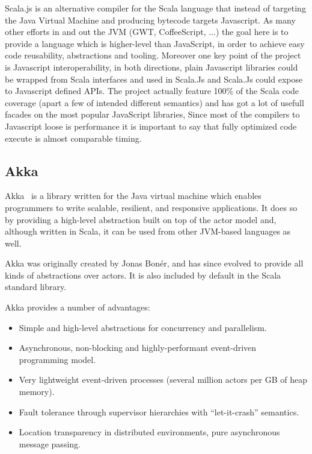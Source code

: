 \documentclass{sig-alternate}
\begin{document}
Scala.js is an alternative compiler for the Scala language that instead of targeting the Java Virtual Machine and producing bytecode targets Javascript.
As many other efforts in and out the JVM (GWT, CoffeeScript, ...) the goal here is to provide a language which is higher-level than JavaScript, in order to achieve easy code reusability, abstractions and tooling.
Moreover one key point of the project is Javascript interoperability, in both directions, plain Javascript libraries could be wrapped from Scala interfaces and used in Scala.Js and Scala.Js could expose to Javascript defined APIs.
The project actually feature 100\% of the Scala code coverage (apart a few of intended different semantics) and has got a lot of usefull facades on the most popular JavaScript libraries,
Since most of the compilers to Javascript loose is performance it is important to say that fully optimized code execute is almost comparable timing.


\newpage
\subsection{Akka}\label{sec:akka}

Akka~\cite{Akka} is a library written for the Java virtual machine which enables programmers to write
scalable, resilient, and responsive applications. It does so by providing a high-level
abstraction built on top of the actor model and, although written in Scala, it can be used
from other JVM-based languages as well.

Akka was originally created by Jonas Bon\'{e}r, and has since evolved to provide all kinds
of abstractions over actors. It is also included by default in the Scala standard library.

Akka provides a number of advantages:
\begin{itemize}
  \item Simple and high-level abstractions for concurrency and parallelism.
  \item Asynchronous, non-blocking and highly-performant event-driven programming model.
  \item Very lightweight event-driven processes (several million actors per GB of heap memory).
  \item Fault tolerance through supervisor hierarchies with ``let-it-crash'' semantics.
  \item Location transparency in distributed environments, pure asynchronous message passing.
\end{itemize}
\end{document}
